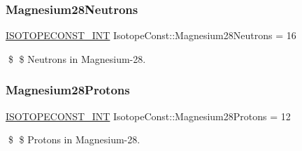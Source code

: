 \subsubsection{\texorpdfstring{Magnesium28\+Neutrons}{Magnesium28Neutrons}}
{\footnotesize\ttfamily \mbox{\hyperlink{group___isotope_const-_macros_ga5f18360b3e99483a35c32d789e62621c}{I\+S\+O\+T\+O\+P\+E\+C\+O\+N\+S\+T\+\_\+\+I\+NT}} Isotope\+Const\+::\+Magnesium28\+Neutrons = 16}

\$ \$ Neutrons in Magnesium-\/28. \mbox{\label{group___isotope_const-_magnesium-_mg28_ga23d908e94f7fa6531275c6c902df4b2c}} 
\subsubsection{\texorpdfstring{Magnesium28\+Protons}{Magnesium28Protons}}
{\footnotesize\ttfamily \mbox{\hyperlink{group___isotope_const-_macros_ga5f18360b3e99483a35c32d789e62621c}{I\+S\+O\+T\+O\+P\+E\+C\+O\+N\+S\+T\+\_\+\+I\+NT}} Isotope\+Const\+::\+Magnesium28\+Protons = 12}

\$ \$ Protons in Magnesium-\/28. 